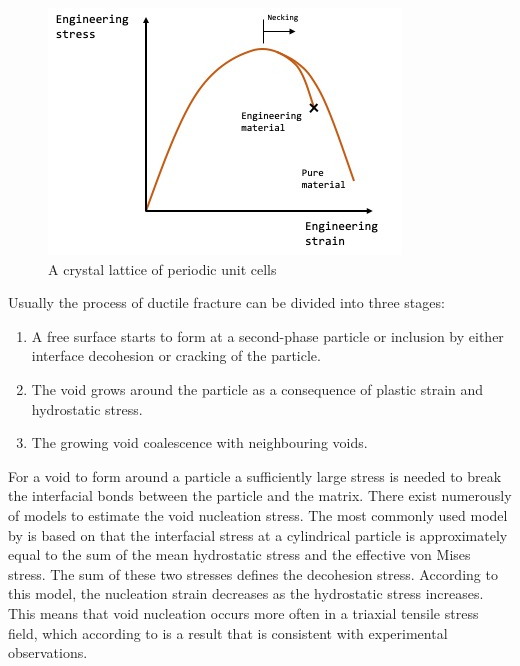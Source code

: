 \documentclass{article}
\begin{document}
\begin{figure}[h!]
    \includegraphics[width=\linewidth]{TensileDeformation.jpg}
    \caption{A crystal lattice of periodic unit cells}
    \label{fig:TensileDeformation}

\end{figure}

Usually the process of ductile fracture can be divided into three stages:

\begin{enumerate}
\item A free surface starts to form at a second-phase particle or inclusion by either interface decohesion or cracking of the particle. 
\item The void grows around the particle as a consequence of plastic strain and hydrostatic stress.
\item The growing void coalescence with neighbouring voids.
\end{enumerate}

For a void to form around a particle a sufficiently large stress is needed to break the interfacial bonds between the particle and the matrix. There exist numerously of models to estimate the void nucleation stress. The most commonly used model by \cite{Argon} is based on that the interfacial stress at a cylindrical particle is approximately equal to the sum of the mean hydrostatic stress and the effective von Mises stress. The sum of these two stresses defines the decohesion stress. According to this model, the nucleation strain decreases as the hydrostatic stress increases. This means that void nucleation occurs more often in a triaxial tensile stress field, which according to \cite{FractureMechanics} is a result that is consistent with experimental observations. 
\end{document}
